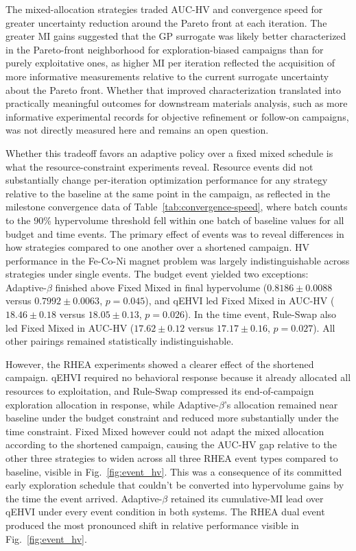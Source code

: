 The mixed-allocation strategies traded AUC-HV and convergence speed for greater uncertainty reduction around the Pareto front at each iteration. The greater MI gains suggested that the GP surrogate was likely better characterized in the Pareto-front neighborhood for exploration-biased campaigns than for purely exploitative ones, as higher MI per iteration reflected the acquisition of more informative measurements relative to the current surrogate uncertainty about the Pareto front. Whether that improved characterization translated into practically meaningful outcomes for downstream materials analysis, such as more informative experimental records for objective refinement or follow-on campaigns, was not directly measured here and remains an open question.

Whether this tradeoff favors an adaptive policy over a fixed mixed schedule is what the resource-constraint experiments reveal. Resource events did not substantially change per-iteration optimization performance for any strategy relative to the baseline at the same point in the campaign, as reflected in the milestone convergence data of Table~\ref{tab:convergence-speed}, where batch counts to the 90\% hypervolume threshold fell within one batch of baseline values for all budget and time events. The primary effect of events was to reveal differences in how strategies compared to one another over a shortened campaign. HV performance in the Fe-Co-Ni magnet problem was largely indistinguishable across strategies under single events. The budget event yielded two exceptions: Adaptive-$\beta$ finished above Fixed Mixed in final hypervolume ($0.8186 \pm 0.0088$ versus $0.7992 \pm 0.0063$, $p = 0.045$), and qEHVI led Fixed Mixed in AUC-HV ($18.46 \pm 0.18$ versus $18.05 \pm 0.13$, $p = 0.026$). In the time event, Rule-Swap also led Fixed Mixed in AUC-HV ($17.62 \pm 0.12$ versus $17.17 \pm 0.16$, $p = 0.027$). All other pairings remained statistically indistinguishable. 

However, the RHEA experiments showed a clearer effect of the shortened campaign. qEHVI required no behavioral response because it already allocated all resources to exploitation, and Rule-Swap compressed its end-of-campaign exploration allocation in response, while Adaptive-$\beta$'s allocation remained near baseline under the budget constraint and reduced more substantially under the time constraint. Fixed Mixed however could not adapt the mixed allocation according to the shortened campaign, causing the AUC-HV gap relative to the other three strategies to widen across all three RHEA event types compared to baseline, visible in Fig.~\ref{fig:event_hv}. This was a consequence of its committed early exploration schedule that couldn't be converted into hypervolume gains by the time the event arrived. Adaptive-$\beta$ retained its cumulative-MI lead over qEHVI under every event condition in both systems. The RHEA dual event produced the most pronounced shift in relative performance visible in Fig.~\ref{fig:event_hv}. 

